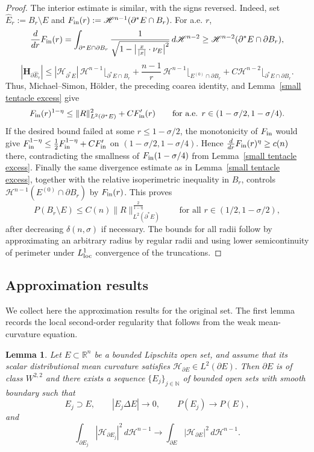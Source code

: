 \documentclass[reqno,11pt]{amsart}
\makeatletter
\newcommand{\HH}{\mathscr H}
\newtheorem{lem}[thm]{Lemma}%
\numberwithin{equation}{section}
\theoremstyle{remark}
\makeatother
\begin{document}
\begin{proof}
 The interior estimate is similar, with the signs reversed. Indeed, set
$\hat E_r:=B_r\setminus E$ and
$F_{\rm in}(r):=\HH^{n-1}(\partial^*E\cap B_r)$. For a.e. $r$,
\[
\frac{d}{dr}F_{\rm in}(r)
=\int_{\partial^*E\cap\partial B_r}
\frac{1}{\sqrt{1-\big|\frac{x}{|x|}\cdot\nu_E\big|^2}}\,d\HH^{n-2}
\ge \HH^{n-2}(\partial^*E\cap\partial B_r),
\]
\[
|\mathbf H_{\partial \hat E_r}|
\le |\mathcal H_{\partial^*E}|\,\HH^{n-1}\lfloor_{\partial^*E\cap B_r}
+\frac{n-1}{r}\,\HH^{n-1}\lfloor_{E^{(0)}\cap\partial B_r}
+C\HH^{n-2}\lfloor_{\partial^*E\cap\partial B_r}.
\]
Thus, Michael--Simon, H\"older, the preceding coarea identity, and
Lemma~\ref{small tentacle excess} give
\[
F_{\rm in}(r)^{1-\eta}
\le \|R\|_{L^2(\partial^*E)}^2+C F_{\rm in}'(r)
\qquad\text{for a.e. }r\in(1-\sigma/2,1-\sigma/4).
\]
If the desired bound failed at some $r\le1-\sigma/2$, the monotonicity of
$F_{\rm in}$ would give
$F_{\rm in}^{1-\eta}\le \frac12F_{\rm in}^{1-\eta}+C F_{\rm in}'$
on $(1-\sigma/2,1-\sigma/4)$. Hence
$\frac{d}{dr}F_{\rm in}(r)^\eta\ge c(n)$ there, contradicting the smallness of
$F_{\rm in}(1-\sigma/4)$ from Lemma~\ref{small tentacle excess}. 
Finally the
same divergence estimate as in Lemma~\ref{small tentacle excess}, together with
the relative isoperimetric inequality in $B_r$, controls
$\HH^{n-1}(E^{(0)}\cap\partial B_r)$ by $F_{\rm in}(r)$.
This proves
\[
P(B_r\setminus E)
\le C(n)\|R\|_{L^2(\partial^*E)}^{\frac{2}{1-\eta}}
\qquad\text{for all }r\in(1/2,1-\sigma/2),
\]
after decreasing $\delta(n,\sigma)$ if necessary.
The bounds for all radii follow by approximating an arbitrary radius by regular radii and using lower semicontinuity of perimeter under $L^1_{\rm loc}$ convergence of the truncations.
\end{proof}



 

\subsection{Approximation results}\label{sec:approx}

We collect here the approximation results for the original set. The first
lemma records the local second-order regularity that follows from the weak
mean-curvature equation.

\begin{lem}\label{smooth C1 approximation}
Let $E\subset \mathbb R^n$ be a bounded Lipschitz open set, and assume that its scalar distributional mean curvature satisfies
$\mathcal H_{\partial E}\in L^2(\partial E).$
Then $\partial E$ is of class $W^{2,2}$ and there exists a sequence $\{E_j\}_{j \in \mathbb N}$ of bounded open sets with smooth boundary
such that
$$
E_j\supset E,\qquad |E_j\Delta E|\to 0,\qquad P(E_j)\to P(E),
$$
and 
$$
\int_{\partial E_j} |\mathcal H_{\partial E_j}|^2\, d\mathscr H^{n-1} \to  \int_{\partial E }|\mathcal H_{\partial E}|^2\, d\mathscr H^{n-1}.
$$
\end{lem}
\end{document}
